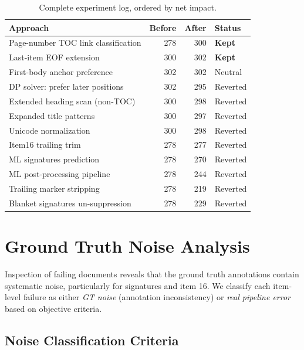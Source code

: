 \documentclass[11pt,a4paper]{article}
\begin{document}
\begin{table}[H]
\centering
\caption{Complete experiment log, ordered by net impact.}
\label{tab:experiments}
\begin{tabular}{>{\raggedright}p{5.8cm}rrl}
\toprule
\textbf{Approach} & \textbf{Before} & \textbf{After} & \textbf{Status}\\
\midrule
Page-number TOC link classification & 278 & 300 & \textbf{Kept}\\
Last-item EOF extension & 300 & 302 & \textbf{Kept}\\
First-body anchor preference & 302 & 302 & Neutral\\
DP solver: prefer later positions & 302 & 295 & Reverted\\
Extended heading scan (non-TOC) & 300 & 298 & Reverted\\
Expanded title patterns & 300 & 297 & Reverted\\
Unicode normalization & 300 & 298 & Reverted\\
Item16 trailing trim & 278 & 277 & Reverted\\
ML signatures prediction & 278 & 270 & Reverted\\
ML post-processing pipeline & 278 & 244 & Reverted\\
Trailing marker stripping & 278 & 219 & Reverted\\
Blanket signatures un-suppression & 278 & 229 & Reverted\\
\bottomrule
\end{tabular}
\end{table}


\section{Ground Truth Noise Analysis}\label{sec:noise}

Inspection of failing documents reveals that the ground truth annotations contain systematic noise, particularly for signatures and item 16. We classify each item-level failure as either \emph{GT noise} (annotation inconsistency) or \emph{real pipeline error} based on objective criteria.

\subsection{Noise Classification Criteria}
\end{document}
